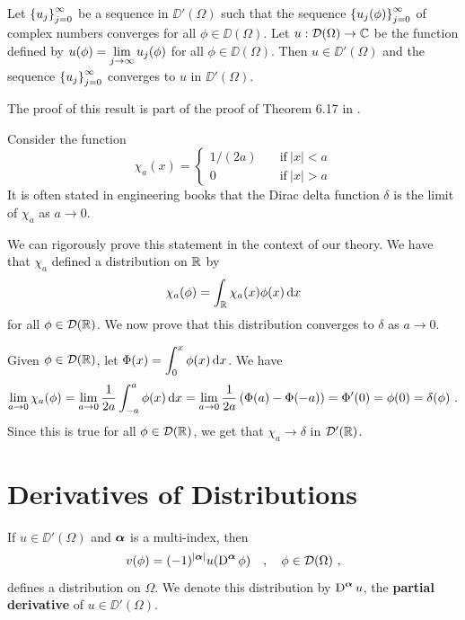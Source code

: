 \begin{prop}
Let $\displaystyle \left\{ u_j \right\}_{j=0}^\infty$ be a sequence
in $\DD'(\Omega)$ such that the sequence
$\displaystyle \left\{ u_j(\phi) \right\}_{j=0}^\infty$ of complex numbers
converges for all $\phi \in \DD(\Omega)$.  Let
$u : \mathcal{D}(\Omega) \to \mathbb{C}$ be the function defined
by $\displaystyle u(\phi) = \lim_{j\to \infty} u_j(\phi)$ for all
$\phi \in \DD(\Omega)$.  Then $u\in \DD'(\Omega)$ and the sequence 
$\displaystyle \left\{ u_j \right\}_{j=0}^\infty$ converges to $u$ in
$\DD'(\Omega)$.
\end{prop}

The proof of this result is part of the proof of Theorem 6.17 in
\cite{RuFA}.

\begin{egg}
Consider the function        \label{chia_delta}
\[
\chi_a(x) =
\begin{cases}
1/(2a) & \quad \text{if} \ |x|<a \\
0 & \quad \text{if} \ |x| >a
\end{cases}
\]
It is often stated in engineering books that the Dirac delta function
$\delta$ is the limit of $\chi_a$ as $a \to 0$.

We can rigorously prove this statement in the context of our theory.
We have that $\chi_a$ defined a distribution on $\mathbb{R}$ by
\[
  \chi_a(\phi) = \int_{\mathbb{R}} \chi_a(x) \phi(x) \,\mathrm{d}{x}
\]
for all $\phi \in \mathcal{D}(\mathbb{R})$.  We now prove that this distribution
converges to $\delta$ as $ a \to 0$.

Given $\phi \in \mathcal{D}(\mathbb{R})$, let
$\displaystyle \Phi(x) = \int_0^x \phi(x) \,\mathrm{d}{x}$.
We have
\[
\lim_{a\to 0} \chi_a(\phi)
= \lim_{a\to 0}\frac{1}{2a} \int_{-a}^a \phi(x) \,\mathrm{d}{x} 
= \lim_{a\to 0}\frac{1}{2a} \left( \Phi(a) - \Phi(-a)\right)
= \Phi'(0) = \phi(0) = \delta(\phi) \ .
\]
Since this is true for all $\phi \in \mathcal{D}(\mathbb{R})$, we get that
$\chi_a \to \delta$ in $\mathcal{D}'(\mathbb{R})$.
\end{egg}

\section{Derivatives of Distributions}

\begin{prop} \label{distr_der_def}
If $u \in \DD'(\Omega)$ and ${\bm{\alpha}}$ is a multi-index, then
\[
v(\phi) = (-1)^{|{\bm{\alpha}}|}u(\operatorname{D}^{{\bm{\alpha}}} \phi) \quad ,
\quad \phi \in \mathcal{D}(\Omega) \ ,
\]
defines a distribution on $\Omega$.  We denote this distribution by
$\displaystyle \operatorname{D}^{{\bm{\alpha}}} u$, the
{\bfseries partial derivative}
of $u\in \DD'(\Omega)$.
\end{prop}

